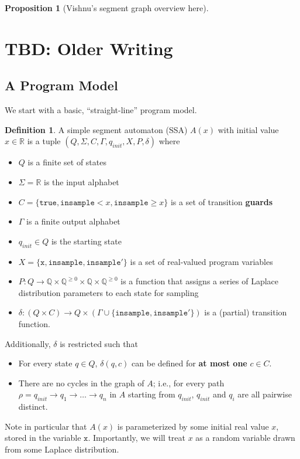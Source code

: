 \documentclass[12pt]{article}
\newcommand{\QQ}{\mathbb{Q}}
\newcommand{\RR}{\mathbb{R}}
\newcommand{\gguard}[1][x]{\texttt{insample}\geq #1}
\newcommand{\lguard}[1][x]{\texttt{insample} < #1}
\newtheorem{prop}[thm]{Proposition}
\theoremstyle{definition}
\newtheorem{defn}[thm]{Definition}
\begin{document}
\begin{prop}
    [Vishnu's segment graph overview here]
\end{prop}

\noindent\hrulefill

\section{TBD: Older Writing}
\subsection{A Program Model}

We start with a basic, ``straight-line'' program model. 

\begin{defn}\label{SSADefn}
    A simple segment automaton (SSA) $A(x)$ with initial value $x\in \RR$ is a tuple $(Q, \Sigma, C, \Gamma, q_{init}, X, P, \delta)$ where\begin{itemize}
        \item $Q$ is a finite set of states
        \item $\Sigma = \RR$ is the input alphabet
        \item $C = \{\texttt{true}, \lguard, \gguard\}$ is a set of transition \textbf{guards}
        \item $\Gamma$ is a finite output alphabet
        \item $q_{init}\in Q$ is the starting state
        \item $X = \{\texttt{x}, \texttt{insample}, \texttt{insample}'\}$ is a set of real-valued program variables
        \item $P: Q\to \QQ\times \QQ^{\geq 0}\times \QQ\times  \QQ^{\geq 0}$ is a function that assigns a series of Laplace distribution parameters to each state for sampling
        \item $\delta: (Q\times C)\to Q\times (\Gamma\cup\{\texttt{insample}, \texttt{insample}'\})$ is a (partial) transition function. 
    \end{itemize}
    Additionally, $\delta$ is restricted such that \begin{itemize}  
        \item For every state $q\in Q$,  $\delta(q, c)$ can be defined for \textbf{at most one} $c\in C$. 
        \item There are no cycles in the graph of $A$; i.e., for every path $\rho = q_{init} \to q_1\to\ldots\to q_n$ in $A$ starting from $q_{init}$, $q_{init}$ and $q_i$ are all pairwise distinct. 
    \end{itemize}

    Note in particular that $A(x)$ is parameterized by some initial real value $x$, stored in the variable $\texttt{x}$. Importantly, we will treat $x$ as a random variable drawn from some Laplace distribution.
\end{defn}
\end{document}

